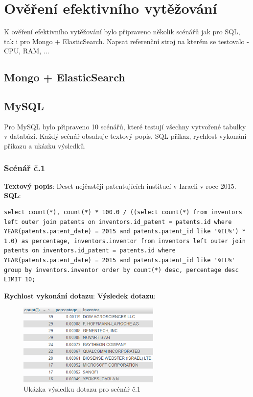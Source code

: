 \lstset{style=sqlstyle}

\chapter{Ověření efektivního vytěžování}
K ověření efektivního vytěžování bylo připraveno několik scénářů jak pro SQL, tak i pro Mongo + ElasticSearch.\newline
Napsat referenční stroj na kterém se testovalo - CPU, RAM, ...
\section{Mongo + ElasticSearch}
\section{MySQL}
Pro MySQL bylo připraveno 10 scénářů, které testují všechny vytvořené tabulky v databázi. Každý scénář obsahuje textový popis, SQL příkaz, rychlost vykonání příkazu a ukázku výsledků.

\subsection{Scénář č.1}
\textbf{Textový popis}: Deset nejčastěji patentujících institucí v Izraeli v roce 2015.
\newline
\textbf{SQL}: 
\begin{lstlisting}[label = {lst:elements_a}]
select count(*), count(*) * 100.0 / ((select count(*) from inventors left outer join patents on inventors.id_patent = patents.id where YEAR(patents.patent_date) = 2015 and patents.patent_id like '%IL%') * 1.0) as percentage, inventors.inventor from inventors left outer join patents on inventors.id_patent = patents.id where YEAR(patents.patent_date) = 2015 and patents.patent_id like '%IL%' group by inventors.inventor order by count(*) desc, percentage desc LIMIT 10;
\end{lstlisting}
\textbf{Rychlost vykonání dotazu}: 
\newline
\textbf{Výsledek dotazu}:
\begin{figure}[H]
\centering
\includegraphics[width=7cm]{img/scenare/scenar_1}
\caption{Ukázka výsledku dotazu pro scénář č.1}
\label{fig:scenar1}
\end{figure}


